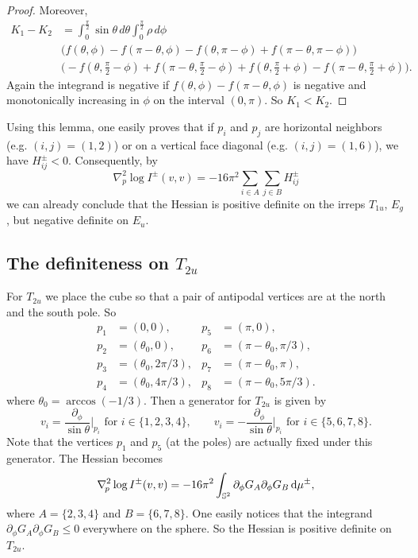 \documentclass[a4paper]{amsart}
\newcommand{\uS}{\mathbb{S}}
\newcommand{\Hess}{\nabla^2}
\newcommand{\dd}{{\rm d}}
\theoremstyle{plain} %
\theoremstyle{definition} %
\theoremstyle{remark}
\begin{document}
\begin{proof}
	Moreover,
	\begin{align*}
		K_1 - K_2 & = \int_0^{\tfrac{\pi}{2}} \sin\theta \, d\theta \int_{0}^{\tfrac{\pi}{2}} \rho \, d\phi \\ &
		\big(
			f(\theta,\phi) - f(\pi - \theta, \phi) - f(\theta, \pi - \phi) + f(\pi - \theta, \pi - \phi)
		\big) \\ &
		\big(
			-f(\theta,\tfrac{\pi}{2}-\phi) + f(\pi - \theta, \tfrac{\pi}{2} - \phi) + f(\theta, \tfrac{\pi}{2} + \phi) - f(\pi - \theta, \tfrac{\pi}{2} + \phi)
		\big).
	\end{align*}
	Again the integrand is negative if $f(\theta, \phi) - f(\pi - \theta, \phi)$
	is negative and monotonically increasing in $\phi$ on the interval $(0,
	\pi)$.  So $K_1 < K_2$.
\end{proof}

Using this lemma, one easily proves that if $p_i$ and $p_j$ are horizontal
neighbors (e.g. $(i,j) = (1,2)$) or on a vertical face diagonal (e.g. $(i,j) =
(1,6)$), we have $H^\pm_{ij} < 0$.  Consequently, by
\[
	\Hess_{\! p} \log I^\pm (v, v) = -16 \pi^2 \sum_{i \in A} \sum_{j \in B} H^\pm_{ij}
\]
we can already conclude that the Hessian is positive definite on
the irreps $T_{1u}$, $E_g$, but negative definite on $E_u$.

\subsection{The definiteness on \texorpdfstring{$T_{2u}$}{T2u}}

For $T_{2u}$ we place the cube so that a pair of antipodal vertices are at the
north and the south pole.  So
\begin{align*}
	p_1 &= (0, 0),&
	p_5 &= (\pi, 0),\\
	p_2 &= (\theta_0, 0),&
	p_6 &= (\pi - \theta_0, \pi/3),\\
	p_3 &= (\theta_0, 2\pi/3),&
	p_7 &= (\pi - \theta_0, \pi),\\
	p_4 &= (\theta_0, 4\pi/3),&
	p_8 &= (\pi - \theta_0, 5\pi/3).
\end{align*}
where $\theta_0 = \arccos(-1/3)$.  Then a generator for $T_{2u}$ is given by
\[
	v_i = \frac{\partial_\phi}{\sin\theta}\Big|_{p_i} \text{ for } i \in \{1, 2, 3, 4\},\qquad
	v_i =-\frac{\partial_\phi}{\sin\theta}\Big|_{p_i} \text{ for } i \in \{5, 6, 7, 8\}.
\]
Note that the vertices $p_1$ and $p_5$ (at the poles) are actually fixed under
this generator.  The Hessian becomes
\[
	\Hess_{\! p} \log I^\pm (v, v)
	= -16\pi^2 \int_{\uS^2} \partial_\phi G_A \partial_\phi G_B \, \dd \mu^\pm,
\]
where $A=\{2,3,4\}$ and $B=\{6,7,8\}$.  One easily notices that the integrand
$\partial_\phi G_A \partial_\phi G_B \le 0$ everywhere on the sphere.  So the
Hessian is positive definite on $T_{2u}$.
\end{document}
